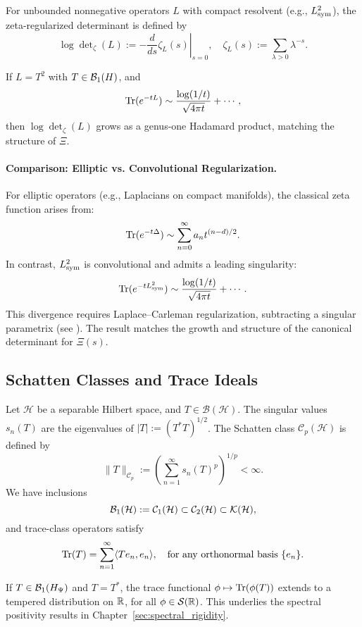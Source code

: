 For unbounded nonnegative operators \( L \) with compact resolvent (e.g., \( L_{\mathrm{sym}}^2 \)), the zeta-regularized determinant is defined by
\[
\log \det\nolimits_\zeta(L) := - \left. \frac{d}{ds} \zeta_L(s) \right|_{s=0}, \quad
\zeta_L(s) := \sum_{\lambda > 0} \lambda^{-s}.
\]

If \( L = T^2 \) with \( T \in \mathcal{B}_1(H) \), and
\[
\operatorname{Tr}(e^{-tL}) \sim \frac{\log(1/t)}{\sqrt{4\pi t}} + \cdots,
\]
then \( \log \det_\zeta(L) \) grows as a genus-one Hadamard product, matching the structure of \( \Xi \).

\paragraph{Comparison: Elliptic vs. Convolutional Regularization.}
For elliptic operators (e.g., Laplacians on compact manifolds), the classical zeta function arises from:
\[
\operatorname{Tr}(e^{-t\Delta}) \sim \sum_{n=0}^\infty a_n t^{(n-d)/2}.
\]
In contrast, \( L_{\mathrm{sym}}^2 \) is convolutional and admits a leading singularity:
\[
\operatorname{Tr}(e^{-t L_{\mathrm{sym}}^2}) \sim \frac{\log(1/t)}{\sqrt{4\pi t}} + \cdots.
\]
This divergence requires Laplace–Carleman regularization, subtracting a singular parametrix (see ). The result matches the growth and structure of the canonical determinant for \( \Xi(s) \).

\subsection*{Schatten Classes and Trace Ideals}

Let \( \mathcal{H} \) be a separable Hilbert space, and \( T \in \mathcal{B}(\mathcal{H}) \). The singular values \( s_n(T) \) are the eigenvalues of \( |T| := (T^*T)^{1/2} \). The Schatten class \( \mathcal{C}_p(\mathcal{H}) \) is defined by
\[
\|T\|_{\mathcal{C}_p} := \left( \sum_{n=1}^\infty s_n(T)^p \right)^{1/p} < \infty.
\]
We have inclusions
\[
\mathcal{B}_1(\mathcal{H}) := \mathcal{C}_1(\mathcal{H}) \subset \mathcal{C}_2(\mathcal{H}) \subset \mathcal{K}(\mathcal{H}),
\]
and trace-class operators satisfy
\[
\operatorname{Tr}(T) = \sum_{n=1}^\infty \langle T e_n, e_n \rangle, \quad \text{for any orthonormal basis } \{ e_n \}.
\]

If \( T \in \mathcal{B}_1(H_{\Psi}) \) and \( T = T^* \), the trace functional \( \phi \mapsto \operatorname{Tr}(\phi(T)) \) extends to a tempered distribution on \( \mathbb{R} \), for all \( \phi \in \mathcal{S}(\mathbb{R}) \). This underlies the spectral positivity results in Chapter~\ref{sec:spectral_rigidity}.
